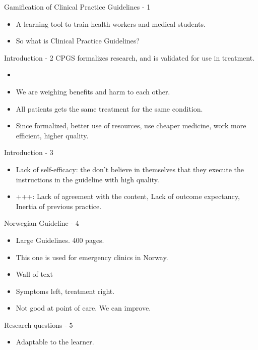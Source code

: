 \documentclass{beamer}
\begin{document}
	
	\begin{frame}{Gamification of Clinical Practice Guidelines - 1}
	\begin{itemize}
		\item A learning tool to train health workers and medical students.
		\item So what is Clinical Practice Guidelines?
	\end{itemize}
\end{frame}

\begin{frame}{Introduction - 2}
CPGS formalizes research, and is validated for use in treatment.
\begin{itemize}
	\item 
	\item We are weighing benefits and harm to each other.
	\item All patients gets the same treatment for the same condition.
	\item Since formalized, better use of resources, use cheaper medicine, work more efficient, higher quality.
\end{itemize}
\end{frame}

\begin{frame}{Introduction - 3}
\begin{itemize}
	\item  Lack of self-efficacy: the don't believe in themselves that they execute the instructions in the guideline with high quality. 
	\item +++: Lack of agreement with the content, Lack of outcome expectancy, Inertia of previous practice. 
\end{itemize}
\end{frame}

\begin{frame}{Norwegian Guideline - 4}
\begin{itemize}
	\item Large Guidelines. 400 pages.
	\item This one is used for emergency clinics in Norway.
	\item Wall of text
	\item Symptoms left, treatment right.
	\item Not good at point of care. We can improve.
\end{itemize}
\end{frame}

\begin{frame}{Research questions - 5}
\begin{itemize}
	\item Adaptable to the learner.
\end{itemize}
\end{frame}
\end{document}

